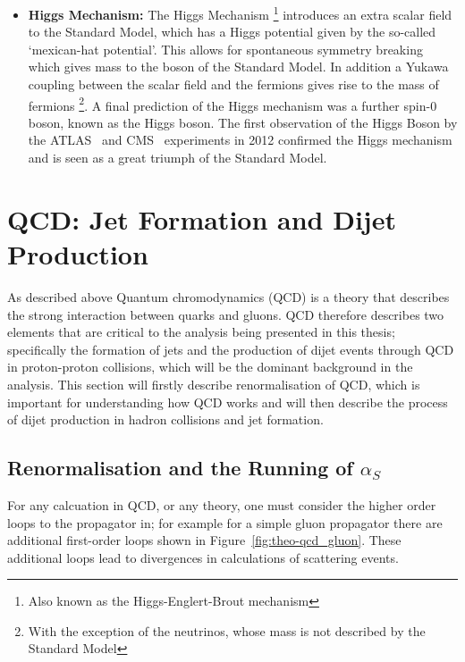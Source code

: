 \begin{itemize}[leftmargin=*]
\item\textbf{Higgs Mechanism:}
  The Higgs Mechanism \footnote{Also known as the Higgs-Englert-Brout mechanism}
  introduces an extra scalar field to the Standard Model,
  which has a Higgs potential given by the so-called `mexican-hat potential'.
  This allows for spontaneous symmetry breaking which gives mass to the boson of the Standard Model.
  In addition a Yukawa coupling between the scalar field and the fermions gives rise to the mass of fermions
  \footnote{With the exception of the neutrinos, whose mass is not described by the Standard Model}.
  A final prediction of the Higgs mechanism was a further spin-0 boson, known as the Higgs boson.
  The first observation of the Higgs Boson by the ATLAS~\cite{theo-higgs_atlas} and CMS~\cite{theo-higgs_cms} experiments
  in 2012 confirmed the Higgs mechanism and is seen as a great triumph of the Standard Model.
\end{itemize}

\section{QCD: Jet Formation and Dijet Production}
\label{theo-qcd}

As described above Quantum chromodynamics (QCD) is a theory that describes the strong interaction between
quarks and gluons.
QCD therefore describes two elements that are critical to the analysis being presented in this thesis;
specifically the formation of jets and the production of dijet events through QCD in proton-proton collisions,
which will be the dominant background in the analysis.
This section will firstly describe renormalisation of QCD, which is important for understanding how QCD works
and will then describe the process of dijet production in hadron collisions and jet formation.

\subsection{Renormalisation and the Running of $\alpha_S$}

For any calcuation in QCD, or any theory, one must consider the higher order loops to the propagator in;
for example for a simple gluon propagator there are additional first-order loops shown in Figure~\ref{fig:theo-qcd_gluon}.
These additional loops lead to divergences in calculations of scattering events.

